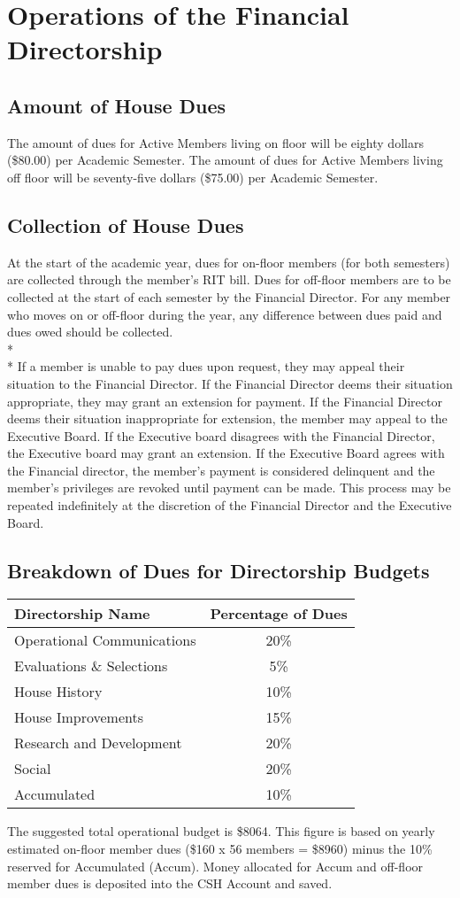 \documentclass{article}
\newcommand{\bylaw}[1]{\section{#1} \label{#1}}
\newcommand{\bsection}[1]{\subsection{#1} \label{#1}}
\begin{document}
\bylaw{Operations of the Financial Directorship}
\bsection{Amount of House Dues}
The amount of dues for Active Members living on floor will be eighty dollars (\$80.00) per Academic Semester. The amount of dues for Active Members living off floor will be seventy-five dollars (\$75.00) per Academic Semester.
\bsection{Collection of House Dues}
At the start of the academic year, dues for on-floor members (for both semesters) are collected through the member’s RIT bill. Dues for off-floor members are to be collected at the start of each semester by the Financial Director. For any member who moves on or off-floor during the year, any difference between dues paid and dues owed should be collected.
\\*\\*
If a member is unable to pay dues upon request, they may appeal their situation to the Financial Director. If the Financial Director deems their situation appropriate, they may grant an extension for payment. If the Financial Director deems their situation inappropriate for extension, the member may appeal to the Executive Board. If the Executive board disagrees with the Financial Director, the Executive board may grant an extension. If the Executive Board agrees with the Financial director, the member’s payment is considered delinquent and the member’s privileges are revoked until payment can be made. This process may be repeated indefinitely at the discretion of the Financial Director and the Executive Board.
\bsection{Breakdown of Dues for Directorship Budgets}
\begin{center}
\begin{tabular}[c]{l c}
Directorship Name & Percentage of Dues \\
\hline
\hline
Operational Communications & 20\% \\
\hline
Evaluations \& Selections & 5\% \\
\hline
House History & 10\% \\
\hline
House Improvements & 15\% \\
\hline
Research and Development & 20\% \\
\hline
Social & 20\% \\
\hline
Accumulated & 10\% \\
\hline
\end{tabular}
\end{center}

The suggested total operational budget is \$8064. This figure is based on yearly estimated on-floor member dues (\$160 x 56 members = \$8960) minus the 10\% reserved for Accumulated (Accum). Money allocated for Accum and off-floor member dues is deposited into the CSH Account and saved.
\end{document}
